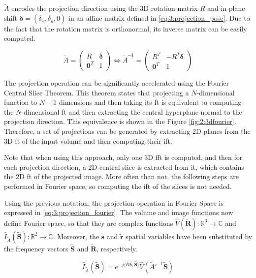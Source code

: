 \documentclass[../main.tex]{subfiles}
\begin{document}
$\tilde{A}$ encodes the projection direction using the 3D rotation matrix $R$ and in-plane shift $\bm{\delta} = (\delta_x, \delta_y, 0)$ in an affine matrix defined in \eqref{eq:3:projection_pose}. Due to the fact that the rotation matrix is orthonormal, its inverse matrix can be easily computed.

\begin{equation}\label{eq:3:projection_pose}
    \tilde{A} = 
    \begin{pmatrix}
        R & \bm{\delta} \\
        \bm{0}^T & 1
    \end{pmatrix}
    \Leftrightarrow
    \tilde{A}^{-1} = 
    \begin{pmatrix}
        R^T & -R^T\bm{\delta} \\
        \bm{0}^T & 1
    \end{pmatrix}
\end{equation}

The projection operation can be significantly accelerated using the Fourier Central Slice Theorem. This theorem states that projecting a $N$-dimensional function to $N-1$ dimensions and then taking its \gls{ft} is equivalent to computing the $N$-dimensional \gls{ft} and then extracting the central hyperplane normal to the projection direction\cite{kak2001}. This equivalence is shown in the Figure \ref{fig:2:3dfourier}. Therefore, a set of projections can be generated by extracting 2D planes from the 3D \gls{ft} of the input volume and then computing their \gls{ift}.

Note that when using this approach, only one 3D \gls{fft} is computed, and then for each projection direction, a 2D central slice is extracted from it, which contains the 2D \gls{ft} of the projected image. More often than not, the following steps are performed in Fourier space, so computing the \gls{ift} of the slices is not needed.

Using the previous notation, the projection operation in Fourier Space is expressed in \eqref{eq:3:projection_fourier}. The volume and image functions now define Fourier space, so that they are complex functions $\hat{V}(\bm{\tilde{R}}): \mathbb{R}^3 \rightarrow \mathbb{C}$ and $\hat{I}_{\tilde{A}}(\bm{\tilde{S}}): \mathbb{R}^2 \rightarrow \mathbb{C}$. Moreover, the $\bm{\tilde{s}}$ and $\bm{\tilde{r}}$ spatial variables have been substituted by the frequency vectors $\bm{\tilde{S}}$ and $\bm{\tilde{R}}$, respectively\cite{sorzano2017b}.

\begin{equation}\label{eq:3:projection_fourier}
    \hat{I}_{\tilde{A}}(\bm{\tilde{S}}) = e^{-j\langle R\bm{\delta, \bm{\tilde{S}}}\rangle}\hat{V}(\tilde{A}'^{-1}\bm{\tilde{S}})
\end{equation}
\end{document}
